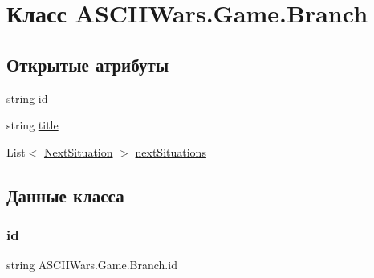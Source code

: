 \hypertarget{class_a_s_c_i_i_wars_1_1_game_1_1_branch}{}\section{Класс A\+S\+C\+I\+I\+Wars.\+Game.\+Branch}
\label{class_a_s_c_i_i_wars_1_1_game_1_1_branch}
\subsection*{Открытые атрибуты}
\begin{DoxyCompactItemize}
\item 
string \hyperlink{class_a_s_c_i_i_wars_1_1_game_1_1_branch_a1282f409f0d3f4920253079ed5f2ba3c}{id}
\item 
string \hyperlink{class_a_s_c_i_i_wars_1_1_game_1_1_branch_aa1a7fc6d8ff84881ecea850ef481616d}{title}
\item 
List$<$ \hyperlink{class_a_s_c_i_i_wars_1_1_game_1_1_next_situation}{Next\+Situation} $>$ \hyperlink{class_a_s_c_i_i_wars_1_1_game_1_1_branch_a1f68675102e4e66e210874145273522c}{next\+Situations}
\end{DoxyCompactItemize}


\subsection{Данные класса}
\hypertarget{class_a_s_c_i_i_wars_1_1_game_1_1_branch_a1282f409f0d3f4920253079ed5f2ba3c}{}\label{class_a_s_c_i_i_wars_1_1_game_1_1_branch_a1282f409f0d3f4920253079ed5f2ba3c} 
\subsubsection{\texorpdfstring{id}{id}}
{\footnotesize\ttfamily string A\+S\+C\+I\+I\+Wars.\+Game.\+Branch.\+id}

\hypertarget{class_a_s_c_i_i_wars_1_1_game_1_1_branch_a1f68675102e4e66e210874145273522c}{}\label{class_a_s_c_i_i_wars_1_1_game_1_1_branch_a1f68675102e4e66e210874145273522c} 
